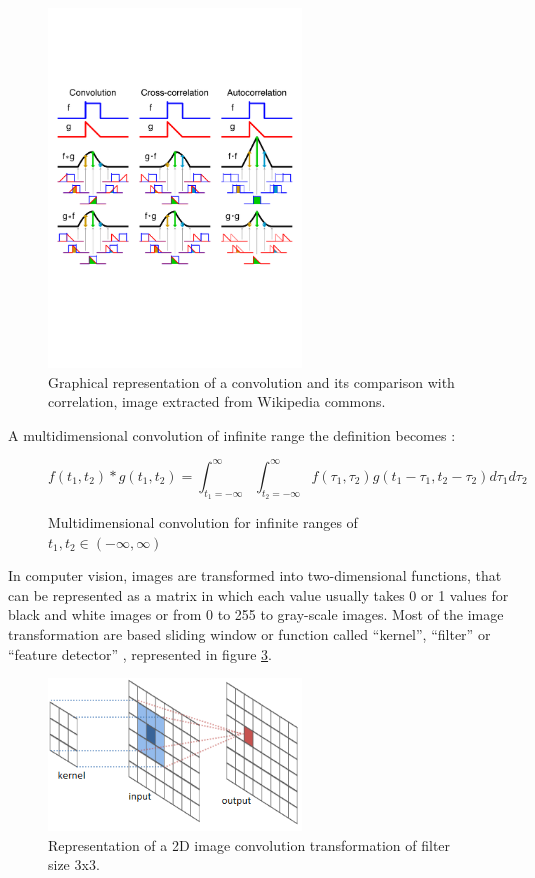 \begin{figure}[!htp]
  \center
  \includegraphics[width=0.6\textwidth]{figures/comparison_convolution_correlation}
  \caption{Graphical representation of a convolution and its comparison with correlation, image extracted from Wikipedia commons.}
  \label{fig:representation_convolution}
\end{figure}

A multidimensional convolution of infinite range the definition becomes \cite{multidimensionalConvolution}: 

\begin{figure}[!htp]
  \center
  \[f(t_1,t_2) \ast g(t_1,t_2) = \int_{t_1=-\infty}^{\infty}\int_{t_2=-\infty}^{\infty} f(\tau _1,\tau _2)g(t_1-\tau _1,t_2-\tau _2)d\tau _1 d\tau _2\]
  \caption{Multidimensional convolution for infinite ranges of $t_1,t_2 \in (-\infty, \infty)$}
  \label{fig:multidimension_convolution_infinite_range}
\end{figure}

In computer vision, images are transformed into two-dimensional functions, that can be represented as a matrix in which each value usually takes 0 or 1 values for black and white images or from 0 to 255 to gray-scale images. Most of the image transformation are based sliding window or function called ``kernel'', ``filter'' or ``feature detector'' \cite{cnnDennyBritz}, represented in figure \ref{fig:convolution_filter}.

\begin{figure}[!htp]
  \center
  \includegraphics[width=0.6\textwidth]{figures/convolution_filter}
  \caption{Representation of a 2D image convolution transformation of filter size 3x3.}
  \label{fig:convolution_filter}
\end{figure}

